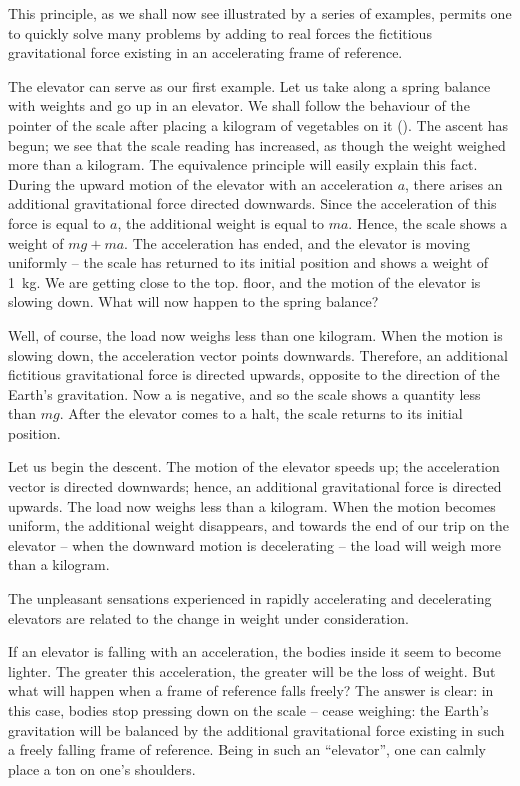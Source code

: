 This principle, as we shall now see illustrated by a
series of examples, permits one to quickly solve many
problems by adding to real forces the fictitious gravitational force existing in an accelerating frame of reference.

The elevator can serve as our first example. Let us take
along a spring balance with weights and go up in an
elevator. We shall follow the behaviour of the pointer
of the scale after placing a kilogram of vegetables on it
(). The ascent has begun; we see that the scale
reading has increased, as though the weight weighed more
than a kilogram. The equivalence principle will easily
explain this fact. During the upward motion of the
elevator with an acceleration $a$, there arises an additional
gravitational force directed downwards. Since the acceleration of this force is equal to $a$, the additional weight is equal to $ma$. Hence, the scale shows a weight of $mg + ma$. The acceleration has ended, and the elevator is moving uniformly -- the scale has returned to its initial position and shows a weight of \SI{1}{\kilo\gram}. We are getting close to the top. floor, and the motion of the elevator is slowing down. What will now happen to the spring balance?

Well, of course, the load now weighs less than one kilogram. When the motion is slowing down, the acceleration vector points downwards. Therefore, an additional fictitious gravitational force is directed upwards, opposite to the direction of the Earth's gravitation. Now a is
negative, and so the scale shows a quantity less than $mg$. After the elevator comes to a halt, the scale returns to its initial position. 

Let us begin the descent. The motion of the elevator speeds up; the acceleration vector is directed downwards; hence, an additional gravitational force is directed upwards. The load now weighs less than
a kilogram. When the motion becomes uniform, the additional weight disappears, and towards the end of our trip on the elevator -- when the downward motion is decelerating -- the load will weigh more than a kilogram.

The unpleasant sensations experienced in rapidly accelerating and decelerating elevators are related to the change in weight under consideration.

If an elevator is falling with an acceleration, the bodies
inside it seem to become lighter. The greater this acceleration, the greater will be the loss of weight. But what will happen when a frame of reference falls freely? The answer is clear: in this case, bodies stop pressing down on the scale -- cease weighing: the Earth's gravitation will be balanced by the additional gravitational force existing in such a freely falling frame of reference. Being in such an ``elevator'', one can calmly place a ton on one's shoulders.

